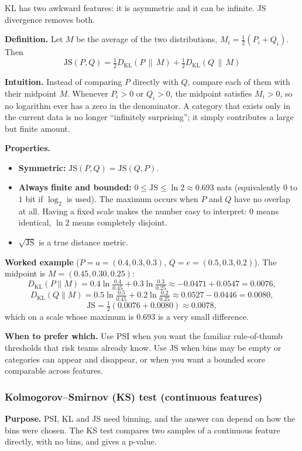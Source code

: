 \documentclass[11pt]{article}
\begin{document}
KL has two awkward features: it is asymmetric and it can be infinite. JS divergence removes both.

\textbf{Definition.} Let \(M\) be the average of the two distributions, \(M_i=\tfrac12(P_i+Q_i)\). Then
\[
\boxed{
\mathrm{JS}(P,Q)=\tfrac12D_{\mathrm{KL}}(P\,\|\,M)+\tfrac12D_{\mathrm{KL}}(Q\,\|\,M)
}
\]

\textbf{Intuition.} Instead of comparing \(P\) directly with \(Q\), compare each of them with their midpoint \(M\). Whenever \(P_i>0\) or \(Q_i>0\), the midpoint satisfies \(M_i>0\), so no logarithm ever has a zero in the denominator. A category that exists only in the current data is no longer ``infinitely surprising''; it simply contributes a large but finite amount.

\textbf{Properties.}
\begin{itemize}
    \item \textbf{Symmetric:} \(\mathrm{JS}(P,Q)=\mathrm{JS}(Q,P)\).
    \item \textbf{Always finite and bounded:} \(0\le\mathrm{JS}\le\ln2\approx0.693\) nats (equivalently \(0\) to \(1\) bit if \(\log_2\) is used). The maximum occurs when \(P\) and \(Q\) have no overlap at all. Having a fixed scale makes the number easy to interpret: \(0\) means identical, \(\ln 2\) means completely disjoint.
    \item \(\sqrt{\mathrm{JS}}\) is a true distance metric.
\end{itemize}

\textbf{Worked example} (\(P=a=(0.4,0.3,0.3)\), \(Q=e=(0.5,0.3,0.2)\)). The midpoint is \(M=(0.45,0.30,0.25)\):
\[
D_{\mathrm{KL}}(P\|M)=0.4\ln\tfrac{0.4}{0.45}+0.3\ln\tfrac{0.3}{0.25}\approx-0.0471+0.0547=0.0076,
\]
\[
D_{\mathrm{KL}}(Q\|M)=0.5\ln\tfrac{0.5}{0.45}+0.2\ln\tfrac{0.2}{0.25}\approx0.0527-0.0446=0.0080,
\]
\[
\mathrm{JS}=\tfrac12(0.0076+0.0080)\approx0.0078,
\]
which on a scale whose maximum is \(0.693\) is a very small difference.

\textbf{When to prefer which.} Use PSI when you want the familiar rule-of-thumb thresholds that risk teams already know. Use JS when bins may be empty or categories can appear and disappear, or when you want a bounded score comparable across features.

\subsubsection{Kolmogorov--Smirnov (KS) test (continuous features)}

\textbf{Purpose.} PSI, KL and JS need binning, and the answer can depend on how the bins were chosen. The KS test compares two samples of a continuous feature directly, with no bins, and gives a p-value.
\end{document}

